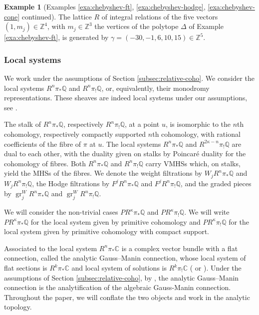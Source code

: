 \documentclass[11pt, reqno]{amsart}
\theoremstyle{plain}
\theoremstyle{definition}
\newtheorem{example}[thm]{Example}
\newcommand{\CC}{\mathbb{C}}
\newcommand{\ZZ}{\mathbb{Z}}
\newcommand{\QQ}{\mathbb{Q}}
\begin{document}
\begin{example}
[Examples \ref{exa:chebyshev-ft}, \ref{exa:chebyshev-hodge}, \ref{exa:chebyshev-cone} continued]
    \label{exa:chebyshev-u} The lattice $R$ of integral relations of the five vectors $(1, m_j) \in \ZZ^4$, with $m_j\in \ZZ^3$ the vertices of the polytope $\Delta$ of Example \ref{exa:chebyshev-ft},  is generated by $\gamma=(-30,-1,6,10,15)\in \ZZ^5$.
\end{example}


\subsubsection{Local systems}  \label{sec:local-systems}
We work under the assumptions of Section \ref{subsec:relative-coho}. We consider the local systems $R^n {\pi}_{*}\QQ$ and $R^n{\pi}_{!}\QQ$, or, equivalently, their monodromy representations.  
These sheaves are indeed local systems under our assumptions, see \cite[Proposition 6.14]{Deligne-equations}. 

The stalk of $R^n {\pi}_{*}\QQ$, respectively $R^n {\pi}_{!}\QQ$,  at a point $u$, is isomorphic to the $n$th cohomology, respectively compactly supported $n$th cohomology, with rational coefficients of the fibre of $\pi$ at $u$. 
The local systems  $R^n {\pi}_* \QQ$ and $R^{2\kappa-n} {\pi}_!\QQ$ are dual to each other, with the duality given on stalks by Poincaré duality for the cohomology of fibres.  
Both $R^n {\pi}_* \QQ$ and $R^n {\pi}_! \QQ$ carry VMHSs which, on stalks, yield the MHSs of the fibres.
We denote the weight filtrations by $W_jR^n {\pi}_* \QQ$ and $W_jR^n {\pi}_{!} \QQ$, the Hodge filtrations by $F^jR^n {\pi}_* \QQ$ and $F^jR^n {\pi}_{!} \QQ$, and the graded pieces by
$\operatorname{gr}_j^W R^n {\pi}_* \QQ$ and $\operatorname{gr}_j^W R^n {\pi}_! \QQ$.

We will consider the non-trivial cases $PR^{\kappa}{\pi}_* \QQ$ and $PR^{\kappa}{\pi}_{!} \QQ$. We will write $PR^{\kappa}{\pi}_* \QQ$ for the local system given by primitive cohomology and $PR^{\kappa}{\pi}_! \QQ $ for the local system given by primitive cohomology with compact support. 

Associated to the local system $R^n{\pi}_*\CC$ is a complex vector bundle with a flat connection, called the analytic Gauss--Manin connection, whose local system of flat sections is $R^k{\pi}_*\CC$ and local system of solutions is 
$R^k{\pi}_!\CC$ (\cite{Deligne-equations} or \cite[Section 9]{Voisin1}). 
Under the assumptions of Section \ref{subsec:relative-coho}, by \cite[Proposition 6.14]{Deligne-equations}, the analytic Gauss--Manin connection is the analytification of the algebraic Gauss-Manin connection. Throughout the paper, we will conflate the two objects and work in the analytic topology.
\smallskip
\end{document}
